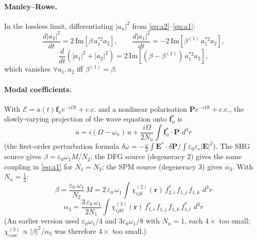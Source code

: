 \documentclass[11pt,a4paper]{article}
\newcommand{\eps}{\varepsilon}
\newcommand{\bvec}[1]{\mathbf{#1}}
\newcommand{\f}{\bvec{f}}
\newcommand{\ri}{\bvec{r}}
\newcommand{\dthreer}{\,d^{3}r}
\newcommand{\chitwo}{\chi^{(2)}}
\newcommand{\chithree}{\chi^{(3)}}
\begin{document}
\paragraph{Manley--Rowe.} In the lossless limit, differentiating $|a_n|^2$ from \eqref{eq:a2}--\eqref{eq:a1}:
\begin{equation}
  \frac{d|a_2|^{2}}{dt}=2\,\mathrm{Im}[\beta\,a_1^{*2}a_2],\qquad
  \frac{d|a_1|^{2}}{dt}=-2\,\mathrm{Im}[\beta^{(1)}\,a_1^{*2}a_2],
\end{equation}
\begin{equation}
  \frac{d}{dt}(|a_1|^{2}+|a_2|^{2})=2\,\mathrm{Im}[(\beta-\beta^{(1)})\,a_1^{*2}a_2],
\end{equation}
which vanishes $\forall a_1,a_2$ iff $\beta^{(1)}=\beta$.

\paragraph{Modal coefficients.} With $\mathcal E=a(t)\f_n e^{-i\Omega t}+\text{c.c.}$
and a nonlinear polarisation $\mathbf P e^{-i\Omega t}+\text{c.c.}$, the
slowly-varying projection of the wave equation onto $\f_n^*$ is
\begin{equation}
  \dot a=i(\Omega-\omega_n)\,a+\frac{i\Omega}{2N_n}\!\int\!\f_n^*\!\cdot\mathbf P\,\dthreer
  \label{eq:projection}
\end{equation}
(the first-order perturbation formula $\delta\omega=-\tfrac{\omega}{2}\int\mathbf E^*\!\cdot\delta\mathbf P/\int\eps_0\eps_r|\mathbf E|^2$).
The SHG source gives $\beta=\eps_0\omega_1M/N_2$; the DFG source (degeneracy $2$)
gives the same coupling in \eqref{eq:a1} for $N_1=N_2$; the SPM source
(degeneracy $3$) gives $\alpha_3$.  With $N_n=\tfrac12$:
\begin{equation}
  \boxed{\;\beta=\frac{\eps_0\,\omega_1}{N_2}\,M=2\,\eps_0\,\omega_1\!\int\!\chitwo_{ijk}(\ri)\,
                f_{2,i}^*\,f_{1,j}\,f_{1,k}\,\dthreer\;}
\label{eq:beta}
\end{equation}
\begin{equation}
  \boxed{\;\alpha_3=\frac{3\,\eps_0\,\omega_1}{2N_1}\!\int\!\chithree_{ijkl}(\ri)\,
                  f_{1,i}^*\,f_{1,j}\,f_{1,k}\,f_{1,l}^*\,\dthreer\;}
\label{eq:alpha3}
\end{equation}
(An earlier version used $\eps_0\omega_1/4$ and $3\eps_0\omega_1/8$ with
$N_n=1$, each $4\times$ too small; $\chithree_\text{casc}\propto|\beta|^2/\alpha_3$
was therefore $4\times$ too small.)

\end{document}
